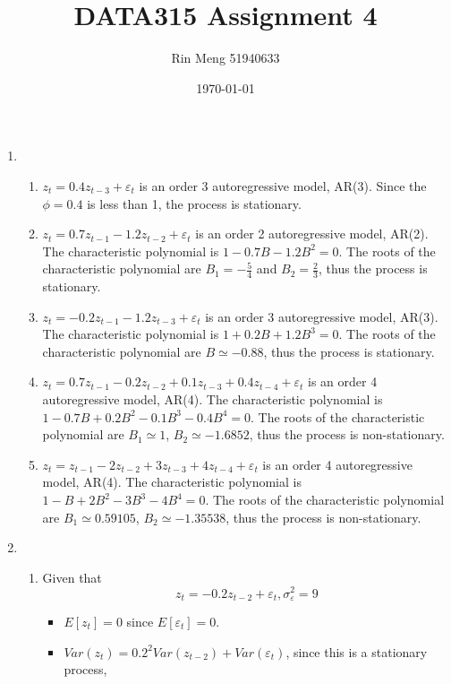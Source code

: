 \documentclass[12pt]{article}
\title{DATA315 Assignment 4}
\author{Rin Meng 51940633}
\date{\today}
\begin{document}
\maketitle

\begin{enumerate}
    \item 
    \begin{enumerate}
        \item $z_t = 0.4z_{t-3} + \varepsilon_t$ is an order 3 autoregressive model, AR(3). 
        Since the $\phi = 0.4$ is less than 1, the process is stationary.
        \item $z_t = 0.7z_{t-1} - 1.2z_{t-2} + \varepsilon_t$  is an order 2 autoregressive model, AR(2).
        The characteristic polynomial is $1 - 0.7B - 1.2B^2 = 0$. 
        The roots of the characteristic polynomial are $B_1 = - \frac{5}{4}$ and $B_2 = \frac{2}{3}$, 
        thus the process is stationary.
        \item $z_t = - 0.2z_{t-1} -1.2z_{t-3} + \varepsilon_t$ is an order 3 autoregressive model, AR(3).
        The characteristic polynomial is $1 + 0.2B + 1.2B^3 = 0$.
        The roots of the characteristic polynomial are $B \simeq -0.88$, thus the process is stationary.
        \item $z_t = 0.7 z_{t-1} - 0.2 z_{t-2} + 0.1 z_{t-3} + 0.4 z_{t-4} + \varepsilon_t$ is an order 4 autoregressive model, AR(4).
        The characteristic polynomial is $1 - 0.7B + 0.2B^2 - 0.1B^3 - 0.4B^4 = 0$. 
        The roots of the characteristic polynomial are $B_1 \simeq 1$, $B_2 \simeq -1.6852$, thus the process is non-stationary.
        \item $z_t = z_{t-1} - 2 z_{t-2} + 3 z_{t-3} + 4 z_{t-4} + \varepsilon_t$ is an order 4 autoregressive model, AR(4).
        The characteristic polynomial is $1 - B + 2B^2 - 3B^3 - 4B^4 = 0$. 
        The roots of the characteristic polynomial are $B_1 \simeq 0.59105$, $B_2 \simeq -1.35538$, thus the process is non-stationary. 
    \end{enumerate}
    \item 
    \begin{enumerate}
        \item Given that 
        \[ z_t = -0.2 z_{t-2} + \varepsilon_t, \sigma^2_{\varepsilon} = 9 \]
        \begin{itemize}
            \item $E[z_t] = 0$ since $E[\varepsilon_t] = 0$.
            \item $Var(z_t) = 0.2^2 Var(z_{t-2}) + Var(\varepsilon_t)$, since this is a stationary process, 

\end{itemize}
\end{enumerate}
\end{enumerate}
\end{document}

